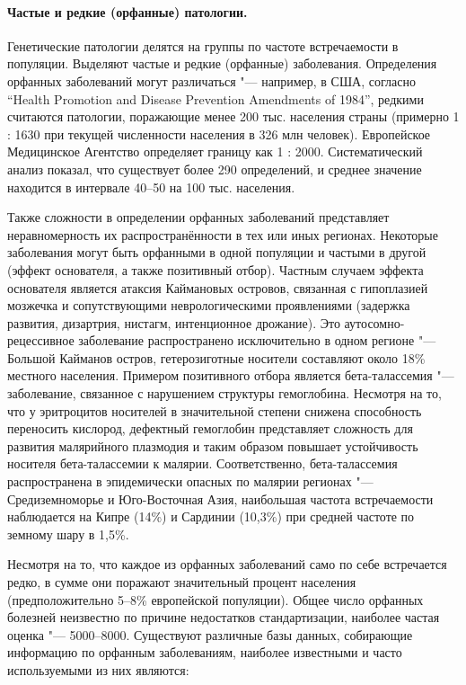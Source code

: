 \documentclass[a4paper,12pt]{article}
\begin{document}
\paragraph{Частые и редкие (орфанные) патологии.}
Генетические патологии делятся на группы по частоте встречаемости в популяции.
Выделяют частые и редкие (орфанные) заболевания.
Определения орфанных заболеваний могут различаться "--- например, в США, согласно ``Health Promotion and Disease Prevention Amendments of 1984'', редкими считаются патологии, поражающие менее 200 тыс. населения страны (примерно 1 : 1630 при текущей численности населения в 326 млн человек)\cite{herder}.
Европейское Медицинское Агентство определяет границу как 1 : 2000.
Систематический анализ показал, что существует более 290 определений, и среднее значение находится в интервале 40--50 на 100 тыс. населения\cite{richter}.

Также сложности в определении орфанных заболеваний представляет неравномерность их распространённости в тех или иных регионах.
Некоторые заболевания могут быть орфанными в одной популяции и частыми в другой (эффект основателя, а также позитивный отбор).
Частным случаем эффекта основателя является атаксия Каймановых островов, связанная с гипоплазией мозжечка и сопутствующими неврологическими проявлениями (задержка развития, дизартрия, нистагм, интенционное дрожание).
Это аутосомно-рецессивное заболевание распространено исключительно в одном регионе "--- Большой Кайманов остров, гетерозиготные носители составляют около 18\% местного населения\cite{bomar}.
Примером позитивного отбора является бета-талассемия "--- заболевание, связанное с нарушением структуры гемоглобина.
Несмотря на то, что у эритроцитов носителей в значительной степени снижена способность переносить кислород, дефектный гемоглобин представляет сложность для развития малярийного плазмодия и таким образом повышает устойчивость носителя бета-талассемии к малярии\cite{galanello}.
Соответственно, бета-талассемия распространена в эпидемически опасных по малярии регионах "--- Средиземноморье и Юго-Восточная Азия, наибольшая частота встречаемости наблюдается на Кипре (14\%) и Сардинии (10,3\%) при средней частоте по земному шару в 1,5\%.

Несмотря на то, что каждое из орфанных заболеваний само по себе встречается редко, в сумме они поражают значительный процент населения (предположительно 5--8\% европейской популяции).
Общее число орфанных болезней неизвестно по причине недостатков стандартизации, наиболее частая оценка "--- 5000--8000\cite{lancet}.
Существуют различные базы данных, собирающие информацию по орфанным заболеваниям, наиболее известными и часто используемыми из них являются:
\end{document}
